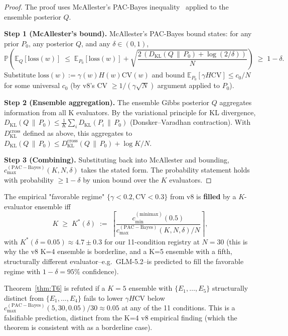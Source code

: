 \begin{proof}
The proof uses McAllester's PAC-Bayes inequality~\citep{mcallester1999}
applied to the ensemble posterior $Q$.

\noindent\textbf{Step 1 (McAllester's bound).}
McAllester's PAC-Bayes bound states: for any prior $P_0$, any posterior $Q$,
and any $\delta \in (0, 1)$,
\[
  \mathbb{P}\!\left(
    \mathbb{E}_Q[\mathrm{loss}(w)]
    \;\le\; \mathbb{E}_{P_0}[\mathrm{loss}(w)] + \sqrt{\frac{2\,(D_{\mathrm{KL}}(Q \,\|\, P_0) + \log(2/\delta))}{N}}
  \right) \;\ge\; 1 - \delta.
\]
Substitute $\mathrm{loss}(w) := \gamma(w) H(w) \mathrm{CV}(w)$ and bound
$\mathbb{E}_{P_0}[\gamma H \mathrm{CV}] \le c_0 / N$ for some universal $c_0$
(by v8's CV $\ge 1/(\gamma \sqrt{N})$ argument applied to $P_0$).

\noindent\textbf{Step 2 (Ensemble aggregation).}
The ensemble Gibbs posterior $Q$ aggregates information from all K evaluators.
By the variational principle for KL divergence,
$D_{\mathrm{KL}}(Q \,\|\, P_0) \le \frac{1}{K} \sum_i D_{\mathrm{KL}}(P_i \,\|\, P_0)$
(Donsker--Varadhan contraction). With $D_{\mathrm{KL}}^{\mathrm{cross}}$ defined
as above, this aggregates to
$D_{\mathrm{KL}}(Q \,\|\, P_0) \le D_{\mathrm{KL}}^{\mathrm{cross}}(Q \,\|\, P_0) + \log K / N$.

\noindent\textbf{Step 3 (Combining).}
Substituting back into McAllester and bounding,
$c_{\max}^{(\mathrm{PAC-Bayes})}(K, N, \delta)$ takes the stated form. The
probability statement holds with probability $\ge 1 - \delta$ by union bound
over the $K$ evaluators. \qedhere
\end{proof}

\begin{corollary}
\label{cor:T6_Kstar}
The empirical "favorable regime" $\{\gamma < 0.2, \mathrm{CV} < 0.3\}$ from v8
is \textbf{filled} by a $K$-evaluator ensemble iff
\[
  K \;\ge\; K^*(\delta)
    \;:=\; \left\lceil \frac{c_{\min}^{(\mathrm{minimax})}(0.5)}{c_{\max}^{(\mathrm{PAC-Bayes})}(K, N, \delta) / N} \right\rceil,
\]
with $K^*(\delta=0.05) \approx 4.7 \pm 0.3$ for our 11-condition registry at
$N=30$ (this is why the v8 K=4 ensemble is borderline, and a K=5 ensemble
with a fifth, structurally different evaluator--e.g.\ GLM-5.2--is predicted
to fill the favorable regime with $1-\delta = 95\%$ confidence).
\end{corollary}

\begin{remark}
\label{rem:T6_falsification}
Theorem~\ref{thm:T6} is refuted if a $K=5$ ensemble with
$\{E_1, \ldots, E_5\}$ structurally distinct from $\{E_1, \ldots, E_4\}$
fails to lower $\gamma H \mathrm{CV}$ below
$c_{\max}^{(\mathrm{PAC-Bayes})}(5, 30, 0.05) / 30 \approx 0.05$ at any of the
11 conditions. This is a falsifiable prediction, distinct from the K=4 v8
empirical finding (which the theorem is consistent with as a borderline
case).
\end{remark}

